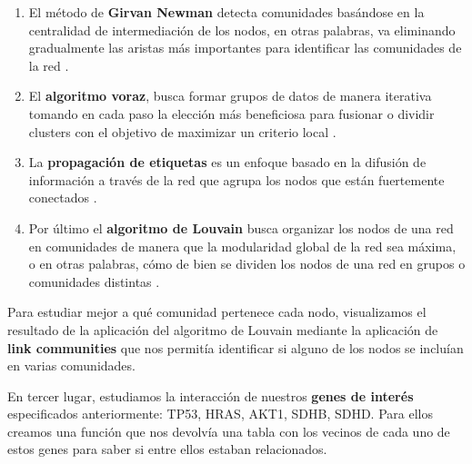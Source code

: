 \vspace{3pt}
\begin{enumerate}
\item El método de \textbf{Girvan Newman} detecta comunidades basándose en la centralidad de intermediación de los nodos, en otras palabras, va eliminando gradualmente las aristas más importantes para identificar las comunidades de la red \cite{Zahiri2023}.


\item El \textbf{algoritmo voraz}, busca formar grupos de datos de manera iterativa tomando en cada paso la elección más beneficiosa para fusionar o dividir clusters con el objetivo de maximizar un criterio local \cite{Curtis2003}. 


\item La \textbf{propagación de etiquetas} es un enfoque basado en la difusión de información a través de la red que agrupa los nodos que están fuertemente conectados \cite{Garza2019}.

\item Por último el \textbf{algoritmo de Louvain} busca organizar los nodos de una red en comunidades de manera que la modularidad global de la red sea máxima, o en otras palabras, cómo de bien se dividen los nodos de una red en grupos o comunidades distintas \cite{Zhang2021}.

\end{enumerate}

\vspace{3pt}

Para estudiar mejor a qué comunidad pertenece cada nodo, visualizamos el resultado de la aplicación del algoritmo de Louvain mediante la aplicación de \textbf{link communities} que nos permitía identificar si alguno de los nodos se incluían en varias comunidades. 

\vspace{3pt}

En tercer lugar, estudiamos la interacción de nuestros \textbf{genes de interés} especificados anteriormente: TP53, HRAS, AKT1, SDHB, SDHD. Para ellos creamos una función que nos devolvía una tabla con los vecinos de cada uno de estos genes para saber si entre ellos estaban relacionados.

